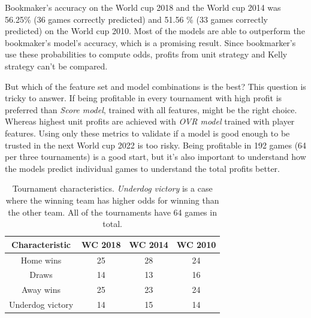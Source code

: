 Bookmaker's accuracy on the World cup 2018 and the World cup 2014 was 56.25\% (36 games correctly predicted) and 51.56  \% (33 games correctly predicted) on the World cup 2010. Most of the models are able to outperform the bookmaker's model's accuracy, which is a promising result. Since bookmarker's use these probabilities to compute odds, profits from unit strategy and Kelly strategy can't be compared.

But which of the feature set and model combinations is the best? This question is tricky to answer. If being profitable in every tournament with high profit is preferred than \textit{Score model}, trained with all features, might be the right choice. Whereas highest unit profits are achieved with \textit{OVR model} trained with player features. Using only these metrics to validate if a model is good enough to be trusted in the next World cup 2022 is too risky. Being profitable in 192 games (64 per three tournaments) is a good start, but it's also important to understand how the models predict individual games to understand the total profits better.

\begin{table}
    \caption{Tournament characteristics. \textit{Underdog victory} is a case where the winning team has higher odds for winning than the other team. All of the tournaments have 64 games in total.}
    \begin{tabular}{| c | c|c | c|}
        \hline
        Characteristic & \textbf{WC 2018} & \textbf{WC 2014} & \textbf{WC 2010}\\
        \hline
        Home wins & 25 & 28 & 24\\
        Draws & 14 & 13 & 16\\
        Away wins & 25 & 23 & 24\\
        Underdog victory  & 14 & 15 & 14\\
        \hline
    \end{tabular}
    \label{table:tournamentcharacteristics}
\end{table}


